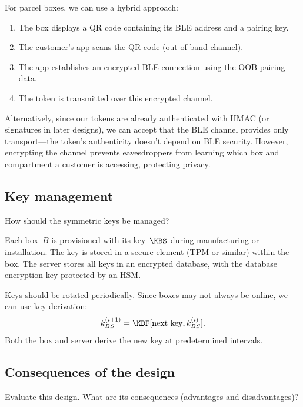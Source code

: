 For parcel boxes, we can use a hybrid approach:
\begin{enumerate}
  \item The box displays a QR code containing its BLE address and a pairing 
    key.
  \item The customer's app scans the QR code (out-of-band channel).
  \item The app establishes an encrypted BLE connection using the OOB pairing 
    data.
  \item The token is transmitted over this encrypted channel.
\end{enumerate}

Alternatively, since our tokens are already authenticated with HMAC (or 
signatures in later designs), we can accept that the BLE channel provides only 
transport---the token's authenticity doesn't depend on BLE security.
However, encrypting the channel prevents eavesdroppers from learning which box 
and compartment a customer is accessing, protecting privacy.

\subsection{Key management}

\begin{exercise}
  How should the symmetric keys be managed?
\end{exercise}

Each box~\(B\) is provisioned with its key~\(\KBS\) during manufacturing or
installation.
The key is stored in a secure element (\ac{TPM} or similar) within the box.
The server stores all keys in an encrypted database, with the database
encryption key protected by an HSM.

Keys should be rotated periodically.
Since boxes may not always be online, we can use key derivation:
\[
  k_{BS}^{(i+1)} = \KDF[\text{next key}, k_{BS}^{(i)}].
\]
Both the box and server derive the new key at predetermined intervals.

\subsection{Consequences of the design}\label{ParcelConsequencesFirst}

\begin{exercise}
  Evaluate this design.
  What are its consequences (advantages and disadvantages)?
\end{exercise}

